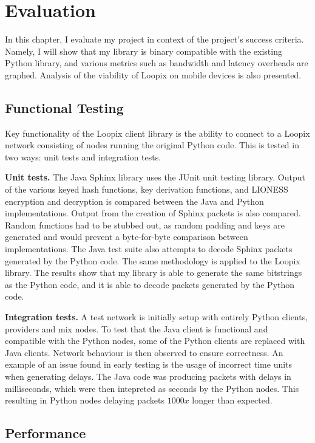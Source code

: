 \documentclass[final,dissertation.tex]{subfiles}
\begin{document}
\chapter{Evaluation} \label{chapter:evaluation}

In this chapter, I evaluate my project in context of the project's success criteria. Namely, I will show that my library is binary compatible with the existing Python library, and various metrics such as bandwidth and latency overheads are graphed. Analysis of the viability of Loopix on mobile devices is also presented.

\section{Functional Testing}

Key functionality of the Loopix client library is the ability to connect to a Loopix network consisting of nodes running the original Python code. This is tested in two ways: unit tests and integration tests.

\textbf{Unit tests.} The Java Sphinx library uses the JUnit unit testing library. Output of the various keyed hash functions, key derivation functions, and LIONESS encryption and decryption is compared between the Java and Python implementations. Output from the creation of Sphinx packets is also compared. Random functions had to be stubbed out, as random padding and keys are generated and would prevent a byte-for-byte comparison between implementations. The Java test suite also attempts to decode Sphinx packets generated by the Python code. The same methodology is applied to the Loopix library. The results show that my library is able to generate the same bitstrings as the Python code, and it is able to decode packets generated by the Python code.

\textbf{Integration tests.} A test network is initially setup with entirely Python clients, providers and mix nodes. To test that the Java client is functional and compatible with the Python nodes, some of the Python clients are replaced with Java clients. Network behaviour is then observed to ensure correctness. An example of an issue found in early testing is the usage of incorrect time units when generating delays. The Java code was producing packets with delays in milliseconds, which were then intepreted as seconds by the Python nodes. This resulting in Python nodes delaying packets $1000x$ longer than expected.

\section{Performance}
\end{document}
